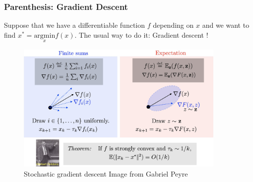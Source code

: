 \documentclass[french,9pt]{beamer}
\begin{document}

\begin{frame}
\frametitle{Parenthesis: Gradient Descent}

Suppose that we have a differentiable function $f$ depending on $x$ and we want to find $x^{*}=\underset{x}{\text{argmin}} f(x)$. The usual way to do it: Gradient descent !

\begin{figure}
  \begin{center}
    \includegraphics[width=0.9\textwidth]{fig/gradient_descent.jpeg}
  \end{center}
  \caption{Stochastic gradient descent \tiny{Image from Gabriel Peyre}}
\end{figure}


\end{frame}


\end{document}
